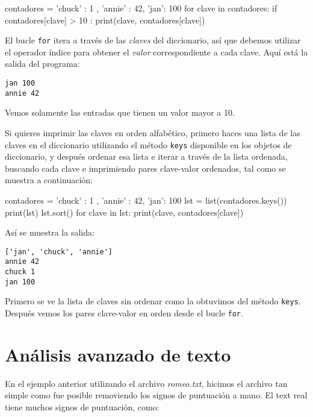 \begin{python}[frame=single]
contadores = { 'chuck' : 1 , 'annie' : 42, 'jan': 100}
for clave in contadores:
    if contadores[clave] > 10 :
        print(clave, contadores[clave])
\end{python}


El bucle \texttt{for} itera a través de las \emph{claves} del
diccionario, así que debemos utilizar el operador índice para obtener el
\emph{valor} correspondiente a cada clave. Aquí está la salida del
programa:

\begin{Verbatim}[frame=single]
jan 100
annie 42
\end{Verbatim}

Vemos solamente las entradas que tienen un valor mayor a 10.

 

Si quieres imprimir las claves en orden alfabético, primero haces una
lista de las claves en el diccionario utilizando el método \texttt{keys}
disponible en los objetos de diccionario, y después ordenar esa lista e
iterar a través de la lista ordenada, buscando cada clave e imprimiendo
pares clave-valor ordenados, tal como se muestra a continuación:


\begin{python}[frame=single]
contadores = { 'chuck' : 1 , 'annie' : 42, 'jan': 100}
lst = list(contadores.keys())
print(lst)
lst.sort()
for clave in lst:
    print(clave, contadores[clave])
\end{python}


Así se muestra la salida:

\begin{verbatim}
['jan', 'chuck', 'annie']
annie 42
chuck 1
jan 100
\end{verbatim}

Primero se ve la lista de claves sin ordenar como la obtuvimos del
método \texttt{keys}. Después vemos los pares clave-valor en orden desde
el bucle \texttt{for}.

\hypertarget{anuxe1lisis-avanzado-de-texto}{%
\section{Análisis avanzado de
texto}\label{anuxe1lisis-avanzado-de-texto}}


En el ejemplo anterior utilizando el archivo \emph{romeo.txt}, hicimos
el archivo tan simple como fue posible removiendo los signos de
puntuación a mano. El text real tiene muchos signos de puntuación, como:

